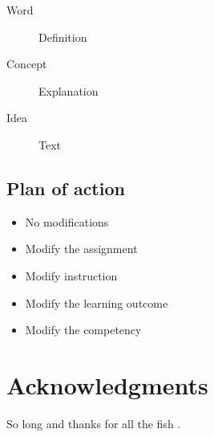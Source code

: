 \documentclass[fleqn,10pt]{SelfArx}\usepackage[]{graphicx}\usepackage[]{color}
\begin{document}
\begin{description}
\item[Word] Definition
\item[Concept] Explanation
\item[Idea] Text
\end{description}

\lipsum[1] %

\subsection{Plan of action}
\lipsum[1] %
\begin{itemize}[noitemsep] %
\item No modifications
\item Modify the assignment
\item Modify instruction
\item Modify the learning outcome
\item Modify the competency
\end{itemize}

\section*{Acknowledgments} %


So long and thanks for all the fish \citep{Figueredo:2009dg}.

\printbibliography[title={References},heading=bibintoc]


\end{document}
